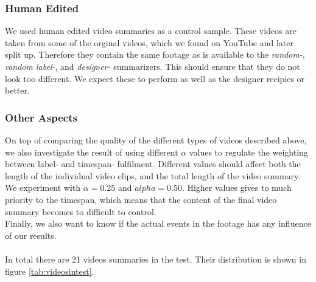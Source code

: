 \subsubsection{Human Edited}
%
We used human edited video summaries as a control sample. These videos are taken from some of the orginal videos, which we found on YouTube and later split up. Therefore they contain the same footage as is available to the \textit{random-}, \textit{random label-}, and \textit{designer-} summarizers. This should ensure that they do not look too different. We expect these to perform as well as the designer recipies or better.
%
\subsubsection{Other Aspects}\label{sec:otheraspects}
%
On top of comparing the quality of the different types of videos described above, we also investigate the result of using different $\alpha$ values to regulate the weighting between label- and timespan- fulfilment. Different values should affect both the length of the individual video clips, and the total length of the video summary. We experiment with $\alpha=0.25$ and $alpha=0.50$. Higher values gives to much priority to the timespan, which means that the content of the final video summary becomes to difficult to control.\\
Finally, we also want to know if the actual events in the footage has any influence of our results.\\\\
%
In total there are 21 videos summaries in the test. Their distribution is shown in figure \ref{tab:videosintest}.
%
